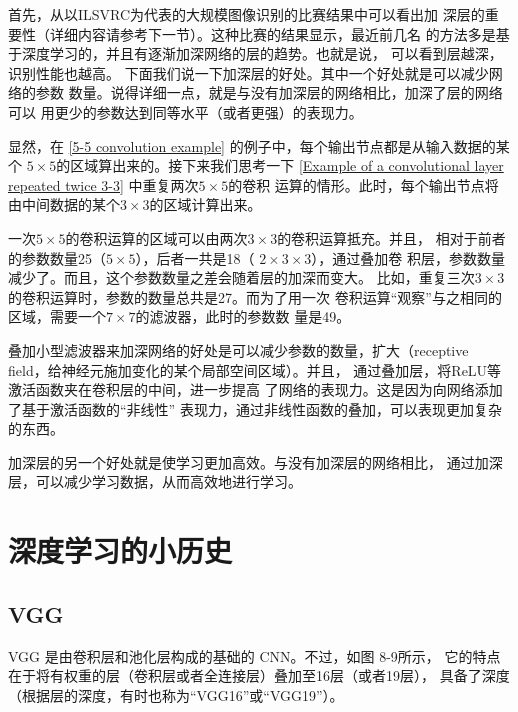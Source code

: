 首先，从以ILSVRC为代表的大规模图像识别的比赛结果中可以看出加
深层的重要性（详细内容请参考下一节）。这种比赛的结果显示，最近前几名
的方法多是基于深度学习的，并且有逐渐加深网络的层的趋势。也就是说，
可以看到层越深，识别性能也越高。
下面我们说一下加深层的好处。其中一个好处就是可以减少网络的参数
数量。说得详细一点，就是与没有加深层的网络相比，加深了层的网络可以
用更少的参数达到同等水平（或者更强）的表现力。


显然，在 \autoref{5-5 convolution example} 的例子中，每个输出节点都是从输入数据的某个
$5\times 5$的区域算出来的。接下来我们思考一下 \autoref{Example of a convolutional layer repeated twice 3-3} 中重复两次$5\times 5$的卷积
运算的情形。此时，每个输出节点将由中间数据的某个$3\times 3$的区域计算出来。


一次$5\times 5$的卷积运算的区域可以由两次$3\times 3$的卷积运算抵充。并且，
相对于前者的参数数量25（$5\times 5$），后者一共是18（ $2\times3\times 3$），通过叠加卷
积层，参数数量减少了。而且，这个参数数量之差会随着层的加深而变大。
比如，重复三次$3\times 3$的卷积运算时，参数的数量总共是27。而为了用一次
卷积运算“观察”与之相同的区域，需要一个$7 \times 7$的滤波器，此时的参数数
量是49。

\begin{tcolorbox}
    叠加小型滤波器来加深网络的好处是可以减少参数的数量，扩大（receptive field，给神经元施加变化的某个局部空间区域）。并且，
    通过叠加层，将ReLU等激活函数夹在卷积层的中间，进一步提高
    了网络的表现力。这是因为向网络添加了基于激活函数的“非线性”
    表现力，通过非线性函数的叠加，可以表现更加复杂的东西。
\end{tcolorbox}

加深层的另一个好处就是使学习更加高效。与没有加深层的网络相比，
通过加深层，可以减少学习数据，从而高效地进行学习。

\section{深度学习的小历史}
\subsection{VGG}
VGG 是由卷积层和池化层构成的基础的 CNN。不过，如图 8-9所示，
它的特点在于将有权重的层（卷积层或者全连接层）叠加至16层（或者19层），
具备了深度（根据层的深度，有时也称为“VGG16”或“VGG19”）。

